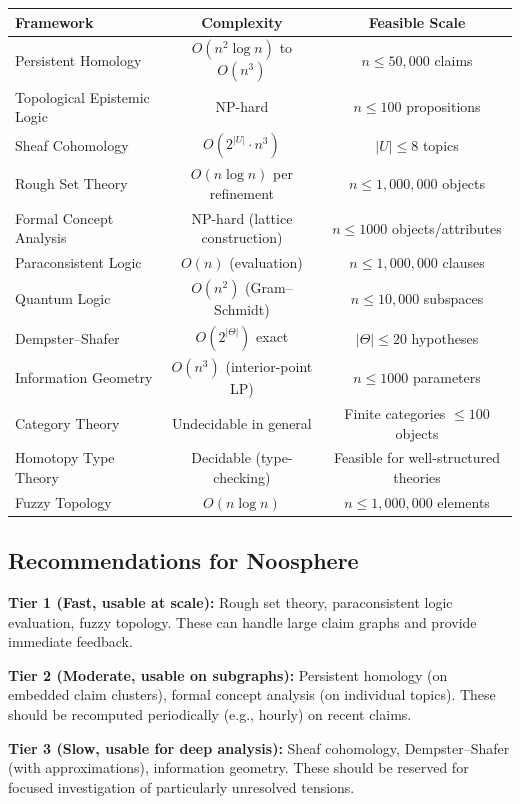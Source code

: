\documentclass[11pt,letterpaper]{article}
\theoremstyle{definition}
\theoremstyle{remark}
\begin{document}
\begin{center}
\begin{tabular}{|l|c|c|}
\hline
\textbf{Framework} & \textbf{Complexity} & \textbf{Feasible Scale} \\
\hline
Persistent Homology & $O(n^2 \log n)$ to $O(n^3)$ & $n \leq 50{,}000$ claims \\
Topological Epistemic Logic & NP-hard & $n \leq 100$ propositions \\
Sheaf Cohomology & $O(2^{|U|} \cdot n^3)$ & $|U| \leq 8$ topics \\
Rough Set Theory & $O(n \log n)$ per refinement & $n \leq 1{,}000{,}000$ objects \\
Formal Concept Analysis & NP-hard (lattice construction) & $n \leq 1000$ objects/attributes \\
Paraconsistent Logic & $O(n)$ (evaluation) & $n \leq 1{,}000{,}000$ clauses \\
Quantum Logic & $O(n^2)$ (Gram--Schmidt) & $n \leq 10{,}000$ subspaces \\
Dempster--Shafer & $O(2^{|\Theta|})$ exact & $|\Theta| \leq 20$ hypotheses \\
Information Geometry & $O(n^3)$ (interior-point LP) & $n \leq 1000$ parameters \\
Category Theory & Undecidable in general & Finite categories $\leq 100$ objects \\
Homotopy Type Theory & Decidable (type-checking) & Feasible for well-structured theories \\
Fuzzy Topology & $O(n \log n)$ & $n \leq 1{,}000{,}000$ elements \\
\hline
\end{tabular}
\end{center}

\subsection{Recommendations for Noosphere}

\textbf{Tier 1 (Fast, usable at scale):} Rough set theory, paraconsistent logic evaluation, fuzzy topology. These can handle large claim graphs and provide immediate feedback.

\textbf{Tier 2 (Moderate, usable on subgraphs):} Persistent homology (on embedded claim clusters), formal concept analysis (on individual topics). These should be recomputed periodically (e.g., hourly) on recent claims.

\textbf{Tier 3 (Slow, usable for deep analysis):} Sheaf cohomology, Dempster--Shafer (with approximations), information geometry. These should be reserved for focused investigation of particularly unresolved tensions.
\end{document}

